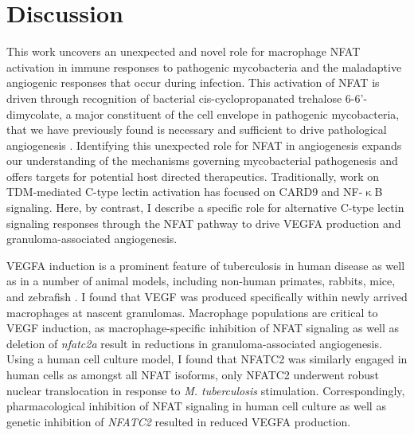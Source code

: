 \section{Discussion}\label{pap:disc}

This work uncovers an unexpected and novel role for macrophage NFAT activation in immune responses to pathogenic mycobacteria and the maladaptive angiogenic responses that occur during infection. This activation of NFAT is driven through recognition of bacterial cis\hyp{}cyclopropanated trehalose 6\hyp{}6'\hyp{}dimycolate, a major constituent of the cell envelope in pathogenic mycobacteria, that we have previously found is necessary and sufficient to drive pathological angiogenesis \citep{Walton2018}. Identifying this unexpected role for NFAT in angiogenesis expands our understanding of the mechanisms governing mycobacterial pathogenesis and offers targets for potential host directed therapeutics. Traditionally, work on TDM\hyp{}mediated C\hyp{}type lectin activation has focused on CARD9 and NF\hyp{}$\upkappa$B signaling. Here, by contrast, I describe a specific role for alternative C\hyp{}type lectin signaling responses through the NFAT pathway to drive VEGFA production and granuloma\hyp{}associated angiogenesis. 

VEGFA induction is a prominent feature of tuberculosis in human disease as well as in a number of animal models, including non\hyp{}human primates, rabbits, mice, and zebrafish \citep{Datta2015, Oehlers2015, Polena2016, Harding2019, Cronan2021, Gideon2022}. I found that VEGF was produced specifically within newly arrived macrophages at nascent granulomas. Macrophage populations are critical to VEGF induction, as macrophage\hyp{}specific inhibition of NFAT signaling as well as deletion of \textit{nfatc2a} result in reductions in granuloma\hyp{}associated angiogenesis. Using a human cell culture model, I found that NFATC2 was similarly engaged in human cells as amongst all NFAT isoforms, only NFATC2 underwent robust nuclear translocation in response to \textit{M. tuberculosis} stimulation. Correspondingly, pharmacological inhibition of NFAT signaling in human cell culture as well as genetic inhibition of \textit{NFATC2} resulted in reduced VEGFA production.

